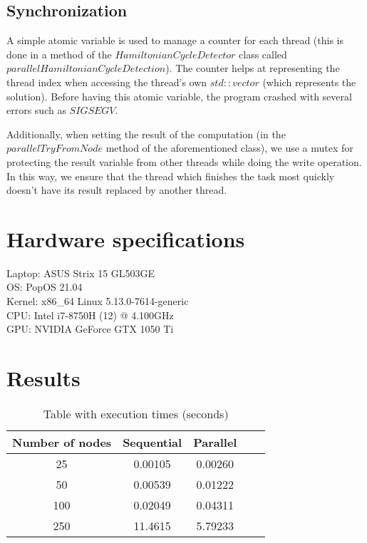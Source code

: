 \documentclass[journal, onecolumn, 12pt]{IEEEtran}
\begin{document}
\subsection{Synchronization}
A simple atomic variable is used to manage a counter for each thread (this is done in a method of the $ HamiltonianCycleDetector $ class called $ parallelHamiltonianCycleDetection $). The counter helps at representing the thread index when accessing the thread's own $ std::vector $ (which represents the solution). Before having this atomic variable, the program crashed with several errors such as $ SIGSEGV $.

Additionally, when setting the result of the computation (in the $ parallelTryFromNode $ method of the aforementioned class), we use a mutex for protecting the result variable from other threads while doing the write operation. In this way, we ensure that the thread which finishes the task most quickly doesn't have its result replaced by another thread.

\section{Hardware specifications}
\noindent
\centering
Laptop: ASUS Strix 15 GL503GE \\
OS: PopOS 21.04 \\
Kernel: x86\_64 Linux 5.13.0-7614-generic\\
CPU: Intel i7-8750H (12) @ 4.100GHz\\
GPU: NVIDIA GeForce GTX 1050 Ti\\

\section{Results}

\begin{table}[ht]
		\caption{Table with execution times (seconds)} 
\begin{tabular}{c c c c c} 
\hline\hline                        
		Number of nodes & Sequential & Parallel  \\ [2ex]
\hline\hline                        
		25 & 0.00105 & 0.00260 \\    
		50 & 0.00539  & 0.01222 \\    
		100 & 0.02049 & 0.04311 \\    
		250 & 11.4615 & 5.79233 \\    

\hline\hline                        
\end{tabular}
\end{table}
	

		
\vspace{12pt}
\end{document}
